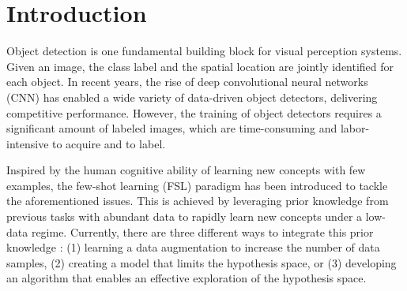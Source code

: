 \documentclass[10pt,twocolumn,letterpaper]{article}
\begin{document}
\begin{figure}[t!]
    \vspace{-2em}
    \label{fig:teaser}
\end{figure}

\section{Introduction}
\label{sec:intro}
Object detection is one fundamental building block for visual perception systems. Given an image, the class label and the spatial location are jointly identified for each object. In recent years, the rise of deep convolutional neural networks (CNN) \cite{CNN} has enabled a wide variety of data-driven object detectors\cite{R-CNN, FastR-CNN, FasterR-CNN, SSD, YOLOv1, YOLOv2, EfficientDet}, delivering competitive performance. However, the training of object detectors requires a significant amount of labeled images, which are time-consuming and labor-intensive to acquire and to label.

Inspired by the human cognitive ability of learning new concepts with few examples, the few-shot learning (FSL) paradigm has been introduced to tackle the aforementioned issues. This is achieved by leveraging prior knowledge from previous tasks with abundant data to rapidly learn new concepts under a low-data regime. Currently, there are three different ways to integrate this prior knowledge \cite{GFSL}: (1) learning a data augmentation to increase the number of data samples, (2) creating a model that limits the hypothesis space, or (3) developing an algorithm that enables an effective exploration of the hypothesis space.  
\end{document}
